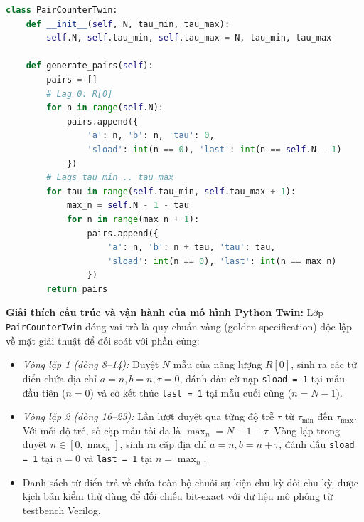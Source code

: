 \begin{lstlisting}[language=Python, caption={Mô hình tương đương \texttt{PairCounterTwin} trong \texttt{ch00\_pair\_counter\_twin.py}}]
class PairCounterTwin:
    def __init__(self, N, tau_min, tau_max):
        self.N, self.tau_min, self.tau_max = N, tau_min, tau_max

    def generate_pairs(self):
        pairs = []
        # Lag 0: R[0]
        for n in range(self.N):
            pairs.append({
                'a': n, 'b': n, 'tau': 0,
                'sload': int(n == 0), 'last': int(n == self.N - 1)
            })
        # Lags tau_min .. tau_max
        for tau in range(self.tau_min, self.tau_max + 1):
            max_n = self.N - 1 - tau
            for n in range(max_n + 1):
                pairs.append({
                    'a': n, 'b': n + tau, 'tau': tau,
                    'sload': int(n == 0), 'last': int(n == max_n)
                })
        return pairs
\end{lstlisting}

\textbf{Giải thích cấu trúc và vận hành của mô hình Python Twin:}
Lớp \texttt{PairCounterTwin} đóng vai trò là quy chuẩn vàng (golden specification) độc lập về mặt giải thuật để đối soát với phần cứng:
\begin{itemize}[leftmargin=1.5em, itemsep=2pt]
    \item \emph{Vòng lặp 1 (dòng 8--14):} Duyệt $N$ mẫu của năng lượng $R[0]$, sinh ra các từ điển chứa địa chỉ $a=n, b=n, \tau=0$, đánh dấu cờ nạp \texttt{sload = 1} tại mẫu đầu tiên ($n=0$) và cờ kết thúc \texttt{last = 1} tại mẫu cuối cùng ($n = N-1$).
    \item \emph{Vòng lặp 2 (dòng 16--23):} Lần lượt duyệt qua từng độ trễ $\tau$ từ $\tau_{\min}$ đến $\tau_{\max}$. Với mỗi độ trễ, số cặp mẫu tối đa là $\max_n = N - 1 - \tau$. Vòng lặp trong duyệt $n \in [0, \max_n]$, sinh ra cặp địa chỉ $a=n, b=n+\tau$, đánh dấu \texttt{sload = 1} tại $n=0$ và \texttt{last = 1} tại $n = \max_n$.
    \item Danh sách từ điển trả về chứa toàn bộ chuỗi sự kiện chu kỳ đối chu kỳ, được kịch bản kiểm thử dùng để đối chiếu bit-exact với dữ liệu mô phỏng từ testbench Verilog.
\end{itemize}

